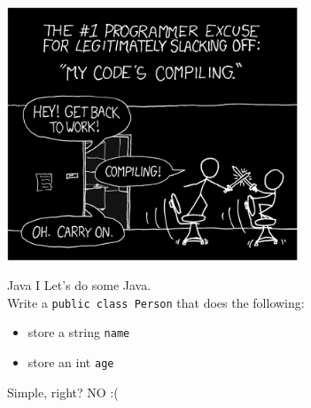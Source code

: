 \documentclass[10pt]{beamer}
\begin{document}
	\begin{frame}
		\begin{center}
			\includegraphics[width=0.65\textwidth]{images/compiling-inv}
		\end{center}
	\end{frame}


	\begin{frame}[fragile]{Java I}
		Let's do some Java.\\
		Write a \texttt{public class Person} that does the following:
		\begin{itemize}
			\item store a string \texttt{name}
			\item store an int \texttt{age}
		\end{itemize}
		Simple, right?
		\vfill\pause
		NO :(
\end{frame}
	
	
\end{document}
